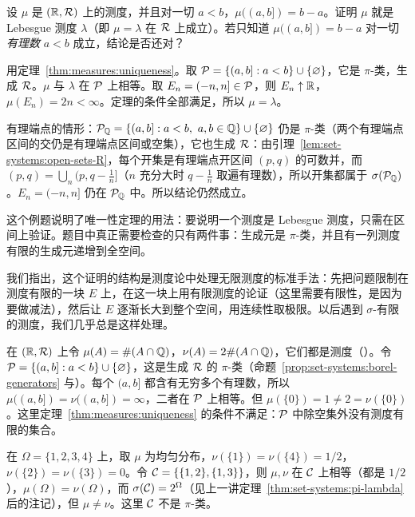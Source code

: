 \begin{workedexample}\label{we:measures:uniqueness-lebesgue}
设 $\mu$ 是 $(\mathbb{R},\mathcal{R})$ 上的测度，并且对一切 $a<b$，$\mu((a,b])=b-a$。证明 $\mu$ 就是 Lebesgue 测度 $\lambda$（即 $\mu=\lambda$ 在 $\mathcal{R}$ 上成立）。若只知道 $\mu((a,b])=b-a$ 对一切\emph{有理数} $a<b$ 成立，结论是否还对？
\end{workedexample}
\begin{solution}
用定理~\ref{thm:measures:uniqueness}。取 $\mathcal{P}=\{(a,b]:a<b\}\cup\{\varnothing\}$，它是 $\pi$-类，生成 $\mathcal{R}$。$\mu$ 与 $\lambda$ 在 $\mathcal{P}$ 上相等。取 $E_n=(-n,n]\in\mathcal{P}$，则 $E_n\uparrow\mathbb{R}$，$\mu(E_n)=2n<\infty$。定理的条件全部满足，所以 $\mu=\lambda$。

有理端点的情形：$\cP_\Q=\{(a,b]:a<b,\ a,b\in\Q\}\cup\{\varnothing\}$ 仍是 $\pi$-类（两个有理端点区间的交仍是有理端点区间或空集），它也生成 $\mathcal{R}$：由引理~\ref{lem:set-systems:open-sets-R}，每个开集是有理端点开区间 $(p,q)$ 的可数并，而 $(p,q)=\bigcup_n(p,q-\frac1n]$（$n$ 充分大时 $q-\frac1n$ 取遍有理数），所以开集都属于 $\sigma(\mathcal{P}_{\mathbb{Q}})$。$E_n=(-n,n]$ 仍在 $\mathcal{P}_{\mathbb{Q}}$ 中。所以结论仍然成立。

这个例题说明了唯一性定理的用法：要说明一个测度是 Lebesgue 测度，只需在区间上验证。题目中真正需要检查的只有两件事：生成元是 $\pi$-类，并且有一列测度有限的生成元递增到全空间。
\end{solution}

我们指出，这个证明的结构是测度论中处理无限测度的标准手法：先把问题限制在测度有限的一块 $E$ 上，在这一块上用有限测度的论证（这里需要有限性，是因为要做减法），然后让 $E$ 逐渐长大到整个空间，用连续性取极限。以后遇到 $\sigma$-有限的测度，我们几乎总是这样处理。

\begin{example}[有限性条件不能去掉]
在 $(\mathbb{R},\mathcal{R})$ 上令 $\mu(A)=\#(A\cap\mathbb{Q})$，$\nu(A)=2\#(A\cap\mathbb{Q})$，它们都是测度（）。令 $\mathcal{P}=\{(a,b]:a<b\}\cup\{\varnothing\}$，这是生成 $\mathcal{R}$ 的 $\pi$-类（命题~\ref{prop:set-systems:borel-generators} 与）。每个 $(a,b]$ 都含有无穷多个有理数，所以 $\mu((a,b])=\nu((a,b])=\infty$，二者在 $\mathcal{P}$ 上相等。但 $\mu(\{0\})=1\neq2=\nu(\{0\})$。这里定理~\ref{thm:measures:uniqueness} 的条件不满足：$\mathcal{P}$ 中除空集外没有测度有限的集合。
\end{example}

\begin{example}[$\pi$-类条件不能去掉]
在 $\Omega=\{1,2,3,4\}$ 上，取 $\mu$ 为均匀分布，$\nu(\{1\})=\nu(\{4\})=1/2$，$\nu(\{2\})=\nu(\{3\})=0$。令 $\mathcal{C}=\{\{1,2\},\{1,3\}\}$，则 $\mu,\nu$ 在 $\mathcal{C}$ 上相等（都是 $1/2$），$\mu(\Omega)=\nu(\Omega)$，而 $\sigma(\mathcal{C})=2^\Omega$（见上一讲定理~\ref{thm:set-systems:pi-lambda} 后的注记），但 $\mu\neq\nu$。这里 $\mathcal{C}$ 不是 $\pi$-类。
\end{example}

